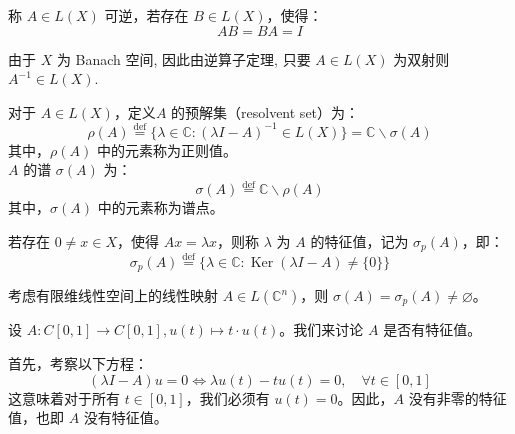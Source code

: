 \documentclass[lang=cn,newtx,10pt,scheme=chinese,thmcnt=chapter]{elegantbook}
\begin{document}
\begin{definition}
称 $A \in L(X)$ 可逆，若存在 $B \in L(X)$，使得：
\begin{equation*}
A B = B A = I
\end{equation*}
\end{definition}
\begin{note}
由于 $X$ 为 Banach 空间, 因此由逆算子定理, 只要 $A \in L (X)$ 为双射则 $A^{-1} \in L (X)$.
\end{note}
\begin{definition}
对于 $A \in L(X)$，定义$A$ 的预解集（resolvent set）为：
\begin{equation*}
\rho(A) \stackrel{\text{def}}{=}\{\lambda \in \mathbb{C} : (\lambda I - A )^{-1}\in L(X)\} = \mathbb{C} \backslash \sigma(A)
\end{equation*}
其中，$\rho(A)$ 中的元素称为正则值。\\
 $A$ 的谱 $\sigma(A)$ 为：
\begin{equation*}
\sigma(A) \stackrel{\text{def}}{=}\mathbb{C}\backslash \rho(A)
\end{equation*}
其中，$\sigma(A)$ 中的元素称为谱点。
\end{definition}

\begin{definition}
若存在 $0 \neq x \in X$，使得 $A x = \lambda x$，则称 $\lambda$ 为 $A$ 的特征值，记为 $\sigma_p(A)$，即：
\begin{equation*}
\sigma_p(A) \stackrel{\text{def}}{=}\{\lambda \in \mathbb{C} : \operatorname{Ker}(\lambda I - A) \neq \{0\} \}
\end{equation*}
\end{definition}

\begin{example}
考虑有限维线性空间上的线性映射 $A \in L(\mathbb{C}^n)$，则 $\sigma(A) = \sigma_p(A) \neq \varnothing$。
\end{example}

\begin{example}
设 $A: C[0,1] \rightarrow C[0,1], u(t) \mapsto t \cdot u(t)$。我们来讨论 $A$ 是否有特征值。


\end{example}

\begin{solution}
首先，考察以下方程：
\begin{equation*}
(\lambda I - A) u = 0 \Leftrightarrow \lambda u(t) - t u(t) = 0, \quad \forall t \in [0,1]
\end{equation*}
这意味着对于所有 $t \in [0,1]$，我们必须有 $u(t) = 0$。因此，$A$ 没有非零的特征值，也即 $A$ 没有特征值。
\end{solution}
\end{document}
